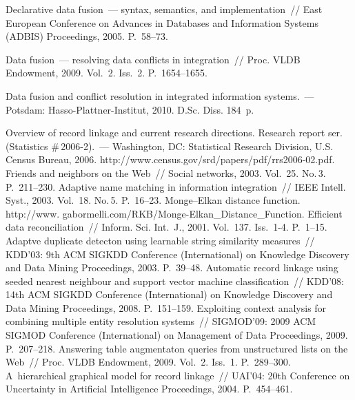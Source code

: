 \begin{multicols}{2}
{{\begin{thebibliography}{99}
 Declarative data fusion~--- syntax, semantics, and
implementation~// East European Conference on Advances in Databases and Information
Systems (ADBIS) Proceedings, 2005. P.~58--73.

 Data fusion~--- resolving data conflicts in integration~//
Proc. VLDB Endowment, 2009. Vol.~2. Iss.~2. P.~1654--1655.

 Data fusion and conflict resolution in integrated
information systems.~--- Potsdam: Hasso-Plattner-Institut, 2010. D.Sc. Diss. 184~p.


 Overview of record linkage and current research directions.
Research
report ser. (Statistics \#\,2006-2).~---
Washington, DC: Statistical Research Division, U.S. Census Bureau, 2006.
{\sf http://www.census.gov/srd/papers/pdf/rrs2006-02.pdf}.
 Friends and neighbors on the Web~// Social networks, 2003.
Vol.~25. No.\,3. P.~211--230.
 Adaptive name matching
in information integration~// IEEE Intell. Syst., 2003. Vol.~18. No.\,5. P.~16--23.
Monge--Elkan distance function.
{\sf http://www. gabormelli.com/RKB/Monge-Elkan\_Distance\_Function}.
 Efficient data reconciliation~//
Inform. Sci. Int.~J., 2001. Vol.~137. Iss.~1-4. P.~1--15.
 Adaptve duplicate detecton using learnable string similarity
measures~// KDD'03: 9th ACM SIGKDD  Conference (International) on Knowledge Discovery
and Data Mining Proceedings, 2003. P.~39--48.
 Automatic record linkage using seeded nearest neighbour and support vector
machine classification~// KDD'08:  14th ACM SIGKDD Conference (International) on
Knowledge Discovery and Data Mining  Proceedings, 2008. P.~151--159.
 Exploiting context analysis for combining
multiple entity resolution systems~// SIGMOD'09: 2009 ACM SIGMOD Conference
(International) on Management of Data Proceedings, 2009. P.~207--218.
 Answering table augmentaton queries from unstructured lists on the
Web~// Proc. VLDB Endowment, 2009. Vol.~2. Iss.~1. P.~289--300.
 A~hierarchical graphical model for record linkage~// UAI'04:
20th Conference on Uncertainty in Artificial Intelligence Proceedings, 2004. P.~454--461.


\end{thebibliography}}}
\end{multicols}
